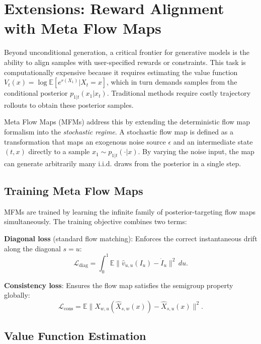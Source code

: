\section{Extensions: Reward Alignment with Meta Flow Maps}
\label{sec:extensions}

Beyond unconditional generation, a critical frontier for generative models is the ability to align samples with user-specified rewards or constraints. This task is computationally expensive because it requires estimating the value function $V_t(x) = \log \mathbb{E}[e^{r(X_1)} | X_t = x]$, which in turn demands samples from the conditional posterior $p_{1|t}(x_1 | x_t)$. Traditional methods require costly trajectory rollouts to obtain these posterior samples.

Meta Flow Maps (MFMs) \citep{potaptchik2026meta} address this by extending the deterministic flow map formalism into the \emph{stochastic regime}. A stochastic flow map is defined as a transformation that maps an exogenous noise source $\epsilon$ and an intermediate state $(t, x)$ directly to a sample $x_1 \sim p_{1|t}(\cdot | x)$. By varying the noise input, the map can generate arbitrarily many i.i.d. draws from the posterior in a single step.

\subsection{Training Meta Flow Maps}

MFMs are trained by learning the infinite family of posterior-targeting flow maps simultaneously. The training objective combines two terms:

\textbf{Diagonal loss} (standard flow matching): Enforces the correct instantaneous drift along the diagonal $s=u$:
\begin{equation}
    \mathcal{L}_{\text{diag}} = \int_0^1 \mathbb{E} \| \hat{v}_{u,u}(I_u) - \dot{I}_u \|^2 \, du.
\end{equation}

\textbf{Consistency loss}: Ensures the flow map satisfies the semigroup property globally:
\begin{equation}
    \mathcal{L}_{\text{cons}} = \mathbb{E} \| \hat{X}_{w,u}(\hat{X}_{s,w}(x)) - \hat{X}_{s,u}(x) \|^2.
\end{equation}

\subsection{Value Function Estimation}


